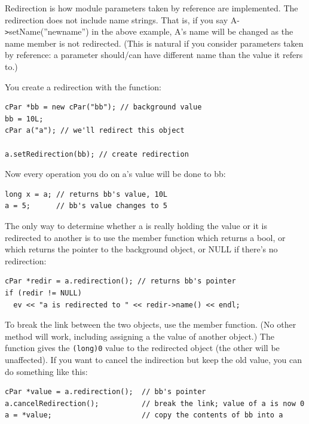Redirection is how module parameters taken by
reference are implemented.  The
redirection does not include name strings. That is, if you say
A-\texttt{>}setName(''newname'') in the above example, A's name will
be changed as the name member is not redirected. (This is natural if
you consider parameters taken by reference: a parameter should/can
have different name than the value it refers to.)


You create a redirection with the  function:

\begin{verbatim}
cPar *bb = new cPar("bb"); // background value
bb = 10L;
cPar a("a"); // we'll redirect this object

a.setRedirection(bb); // create redirection
\end{verbatim}


Now every operation you do on a's value will be done to bb:

\begin{verbatim}
long x = a; // returns bb's value, 10L
a = 5;      // bb's value changes to 5
\end{verbatim}


The only way to determine whether a is really holding the value or it
is redirected to another  is to use the
 member function which returns a bool, or
 which returns the pointer to the background
object, or NULL if there's no redirection:

\begin{verbatim}
cPar *redir = a.redirection(); // returns bb's pointer
if (redir != NULL)
  ev << "a is redirected to " << redir->name() << endl;
\end{verbatim}


To break the link between the two objects, use the
 member function. (No other method will
work, including assigning a the value of another 
object.) The  function gives the \texttt{(long)0}
value to the redirected object (the other will be unaffected). If you
want to cancel the indirection but keep the old value, you can do
something like this:

\begin{verbatim}
cPar *value = a.redirection();  // bb's pointer
a.cancelRedirection();          // break the link; value of a is now 0
a = *value;                     // copy the contents of bb into a
\end{verbatim}




